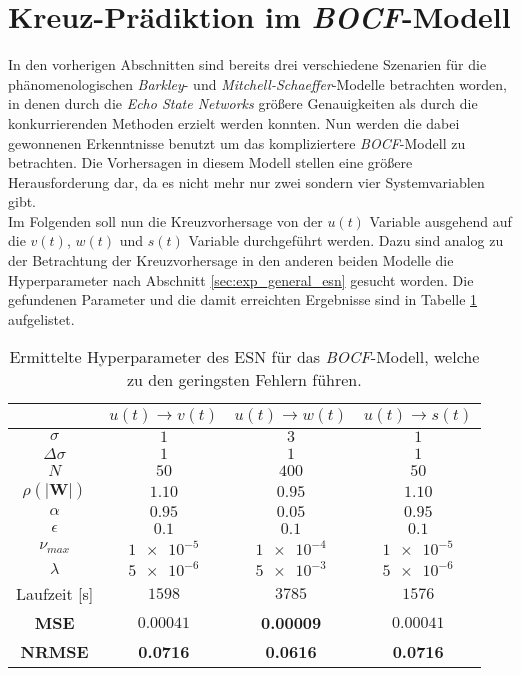 \section{Kreuz-Prädiktion im \textit{BOCF}-Modell}
\label{sec:exp_cross_pred_bocf}
In den vorherigen Abschnitten sind bereits drei verschiedene Szenarien für die phänomenologischen \textit{Barkley}- und \textit{Mitchell-Schaeffer}-Modelle betrachten worden, in denen durch die \textit{Echo State Networks} größere Genauigkeiten als durch die konkurrierenden Methoden erzielt werden konnten. Nun werden die dabei gewonnenen Erkenntnisse benutzt um das kompliziertere \textit{BOCF}-Modell zu betrachten. Die Vorhersagen in diesem Modell stellen eine größere Herausforderung dar, da es nicht mehr nur zwei sondern vier Systemvariablen gibt.\\
Im Folgenden soll nun die Kreuzvorhersage von der $u(t)$ Variable ausgehend auf die $v(t)$, $w(t)$ und $s(t)$ Variable durchgeführt werden. Dazu sind analog zu der Betrachtung der Kreuzvorhersage in den anderen beiden Modelle die Hyperparameter nach Abschnitt \ref{sec:exp_general_esn} gesucht worden. Die gefundenen Parameter und die damit erreichten Ergebnisse sind in Tabelle \ref{tab:exp_cross_bocf_results} aufgelistet. \\

\begin{table}[h]
	\centering
	\captionsetup{width=0.9\linewidth}
	\begin{tabular}{cccc}
		\hline		
		\multicolumn{1}{c}{} &  $u(t) \rightarrow v(t)$ & $u(t) \rightarrow w(t)$ & $u(t) \rightarrow s(t)$\\ 
		\hline 
		\rule[-1ex]{0pt}{2.5ex} $\sigma$ & $1$ & $3$ & $1$\\ 
		\rule[-1ex]{0pt}{2.5ex} $\Delta \sigma$ & $1$ & $1$ & $1$ \\ 
		\rule[-1ex]{0pt}{3.5ex} $N$ & $50$ & $400$ & $50$ \\ 
		\rule[-1ex]{0pt}{3.5ex} $\rho(|\mathbf{W}|)$ & $1.10$ & $0.95$ & $1.10$\\ 
		\rule[-1ex]{0pt}{3.5ex} $\alpha$ & $0.95$ & $0.05$ & $0.95$ \\ 
		\rule[-1ex]{0pt}{3.5ex} $\epsilon$ & $0.1$ & $0.1$ & $0.1$ \\ 
		\rule[-1ex]{0pt}{3.5ex} $\nu_{max}$ & $\num{1e-5}$ & $\num{1e-4}$ & $\num{1e-5}$\\ 
		\rule[-1ex]{0pt}{3.5ex} $\lambda$ & $\num{5e-6}$ & $\num{5e-3}$ & $\num{5e-6}$\\ 
		\rule[-1ex]{0pt}{2.5ex} Laufzeit [s] & $1598$ & $3785$ & $1576$ \\ 
		\rule[-1ex]{0pt}{2.5ex} \textbf{MSE} & \textbf{$\num{0.00041}$} & \textbf{0.00009} & $0.00041$ \\ 
		\rule[-1ex]{0pt}{2.5ex} \textbf{NRMSE} & \textbf{0.0716} & \textbf{0.0616} & \textbf{0.0716} \\ 
		\hline 
	\end{tabular} 
	\caption{Ermittelte Hyperparameter des \textsc{ESN} für das \textit{BOCF}-Modell, welche zu den geringsten Fehlern führen.}
	\label{tab:exp_cross_bocf_results}
\end{table}



\FloatBarrier